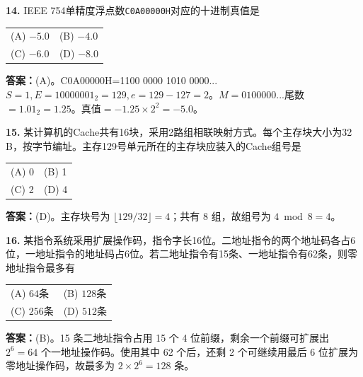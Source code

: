\vspace{6pt}

\noindent\textbf{14.} IEEE 754单精度浮点数\texttt{C0A00000H}对应的十进制真值是
\begin{center}
\begin{tabular}{ll}
(A) $-5.0$ & (B) $-4.0$ \\[6pt]
(C) $-6.0$ & (D) $-8.0$
\end{tabular}
\end{center}

\ifshowsolutions\par\noindent\textbf{答案：}(A)。C0A00000H=1100 0000 1010 0000...$S=1,E=10000001_2=129,e=129-127=2$。$M=0100000...$尾数$=1.01_2=1.25$。真值$=-1.25\times2^2=-5.0$。\else \answerarea \fi

\vspace{6pt}

\noindent\textbf{15.} 某计算机的Cache共有16块，采用2路组相联映射方式。每个主存块大小为32 B，按字节编址。主存129号单元所在的主存块应装入的Cache组号是
\begin{center}
\begin{tabular}{ll}
(A) 0 & (B) 1 \\[6pt]
(C) 2 & (D) 4
\end{tabular}
\end{center}

\ifshowsolutions\par\noindent\textbf{答案：}(D)。主存块号为 $\lfloor129/32\rfloor=4$；共有 8 组，故组号为 $4\bmod8=4$。\else \answerarea \fi

\vspace{6pt}

\noindent\textbf{16.} 某指令系统采用扩展操作码，指令字长16位。二地址指令的两个地址码各占6位，一地址指令的地址码占6位。若二地址指令有15条、一地址指令有62条，则零地址指令最多有
\begin{center}
\begin{tabular}{ll}
(A) $64$条 & (B) $128$条 \\[6pt]
(C) $256$条 & (D) $512$条
\end{tabular}
\end{center}

\ifshowsolutions\par\noindent\textbf{答案：}(B)。15 条二地址指令占用 15 个 4 位前缀，剩余一个前缀可扩展出 $2^6=64$ 个一地址操作码。使用其中 62 个后，还剩 2 个可继续用最后 6 位扩展为零地址操作码，故最多为 $2\times2^6=128$ 条。\else \answerarea \fi

\vspace{6pt}

